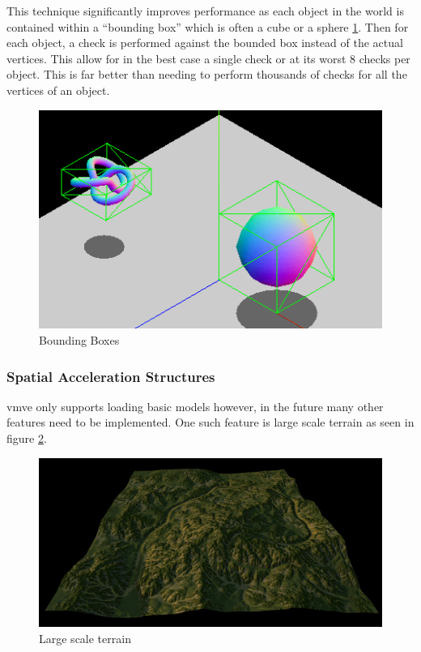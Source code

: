 \documentclass[11pt]{article}
\begin{document}
This technique significantly improves performance as each object in the world is
contained within a ``bounding box'' which is often a cube or a sphere
\ref{fig:bounding_boxes}. Then for each object, a check is performed against the
bounded box instead of the actual vertices. This allow for in the best case a
single check or at its worst 8 checks per object. This is far better than
needing to perform thousands of checks for all the vertices of an object.

\begin{figure}[H]
  \centering
  \includegraphics[width=\textwidth]{images/bounding_boxes.png}
  \caption{Bounding Boxes \cite{bounding_boxes}}
  \label{fig:bounding_boxes}
\end{figure}


\subsubsection{Spatial Acceleration Structures}
\gls*{vmve} only supports loading basic models however, in the future many other
features need to be implemented. One such feature is large scale terrain as seen
in figure \ref{fig:quad_tree_terrain}.

\begin{figure}[H]
  \centering
  \includegraphics[width=\textwidth]{images/quad_tree_terrain.png}
  \caption{Large scale terrain}
  \label{fig:quad_tree_terrain}
\end{figure}
\end{document}
